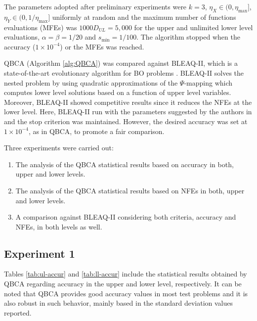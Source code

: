 \documentclass[conference]{IEEEtran}
\theoremstyle{definition}
\begin{document}
The parameters adopted after preliminary
experiments were $k = 3$, $\eta_{X} \in (0, \eta_{\max}]$, $\eta_{Y} \in (0, 1/\eta_{\max}]$ uniformly
at random and the maximum number of functions evaluations (MFEs) was $1000D_{UL}=5,000$
for the upper and unlimited lower level evaluations, $\alpha = \beta = 1 / 20$
and $s_{\min} = 1/100$. The  algorithm stopped when the accuracy ($1\times 10^{-4}$)
or the MFEs was reached.


QBCA (Algorithm \ref{alg:QBCA}) was compared against BLEAQ-II, which is a state-of-the-art
evolutionary algorithm for BO problems \cite{sinha2018review,sinha2013efficient}.
BLEAQ-II solves the nested problem by using quadratic approximations of the
$\Psi$-mapping which computes lower level solutions based on a function of upper
level variables. Moreover, BLEAQ-II showed competitive results since it reduces
the NFEs at the lower level. Here, BLEAQ-II run with the parameters suggested by
the authors in \cite{sinha2018review,sinha2017bilevel} and the stop criterion was
maintained.  However, the desired accuracy was set at $1\times 10^{-4}$, as in
QBCA, to promote a fair comparison.

Three experiments were carried out:
% 
\begin{enumerate}
    \item The analysis of the QBCA statistical results based on accuracy in both,
          upper and lower levels.
    \item The analysis of the QBCA statistical results based on NFEs in both,
          upper and lower levels. 
    \item A comparison against BLEAQ-II considering both criteria, accuracy and
          NFEs, in both levels as well.
\end{enumerate}
% 


\subsection{Experiment 1}
Tables \ref{tab:ul-accur} and \ref{tab:ll-accur} include the statistical results
obtained by QBCA regarding accuracy in the upper and lower level, respectively.
It can be noted that QBCA provides good accuracy values in most test problems
and it is also robust in such behavior, mainly based in the standard deviation
values reported. 
\end{document}
